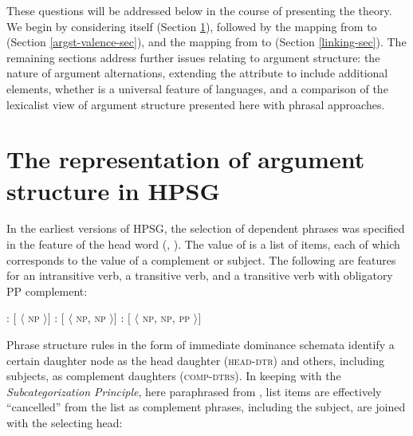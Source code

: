 \documentclass[output=paper
                ,modfonts
                ,nonflat
	        ,collection
	        ,collectionchapter
	        ,collectiontoclongg
 	        ,biblatex
                ,babelshorthands
                ,newtxmath
                ,draftmode
                ,colorlinks, citecolor=brown
]{./langsci/langscibook}
\begin{document}
\noindent
These questions will be addressed below in the course of presenting the theory.  We begin by considering \argst itself (Section \ref{sec:arg-st}), followed by the mapping from \argst to \val (Section \ref{argst-valence-sec}), and the mapping from \content to \argst (Section \ref{linking-sec}).  
The remaining sections address further issues relating to argument structure: the nature of argument alternations, extending the \argst attribute to include additional elements, whether \argst is a universal feature of languages, and a comparison of the lexicalist view of argument structure presented here with phrasal approaches.


\section{The representation of argument structure in HPSG}

\label{sec:arg-st}

In the earliest versions of HPSG, the selection of dependent phrases was specified in the \subcat feature  of the head word (\citealt{pollard+sag:1987}, \citealt[Chapters~1--8]{pollard+sag:1994}).  The value of \subcat is a list of items, each of which corresponds to the \synsem value of a complement or subject.  The following are \subcat features for an intransitive verb, a transitive verb, and a transitive verb with obligatory PP complement:


\begin{exe} 
\ex \label{subcats}
\begin{xlist}
\ex	{}:  $[$ \subcat $\langle$ \textsc{np} $\rangle ]$
\ex    {}:  $[$ \subcat $\langle$ \textsc{np}, \textsc{np} $\rangle ]$
\ex    {}:  $[$ \subcat $\langle$ \textsc{np}, \textsc{np}, \textsc{pp} $\rangle ]$
\end{xlist}
\end{exe}

\noindent
Phrase structure rules in the form of immediate dominance schemata  identify a certain daughter node as the head daughter (\textsc{head-dtr}) and others, including subjects, as complement daughters (\textsc{comp-dtrs}).  In keeping with the \emph{Subcategorization Principle},  here paraphrased from \cite[34]{pollard+sag:1994}, list items are effectively ``cancelled'' from the \subcat list as complement phrases, including the subject, are joined with the selecting head:
\end{document}
